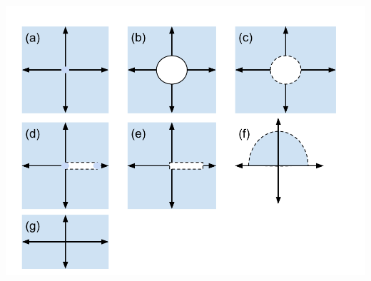 \documentclass{article}
\begin{document}
\begin{center}
    \includegraphics[width=\textwidth]{HW2 prob 6.png}
\end{center}



\end{document}
